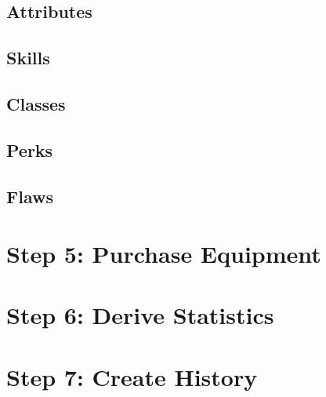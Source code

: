 \documentclass[10pt,twoside,openany]{book}
\begin{document}
\begin{multicols}{2}
		\subsection{Attributes}

		\subsection{Skills}

		\subsection{Classes}

		\subsection{Perks}

		\subsection{Flaws}

	\section{Step 5: Purchase Equipment}

	\section{Step 6: Derive Statistics}

	\section{Step 7: Create History}

\end{multicols}
\end{document}
